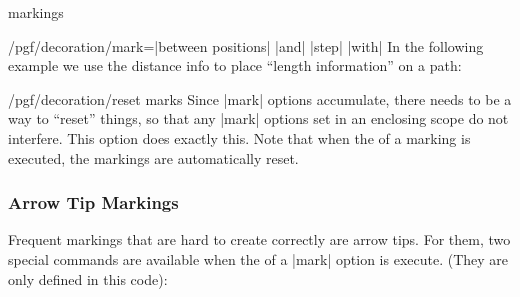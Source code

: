 \begin{decoration}{markings}
\begin{key}{/pgf/decoration/mark=|between positions|
       |and|  |step| 
      |with| }
    In the following example we use the distance info to place
    ``length information'' on a path:
\begin{codeexample}[]
\end{codeexample}      
  \end{key}

  \begin{key}{/pgf/decoration/reset marks}
    Since |mark| options accumulate, there needs to be a way to
    ``reset'' things, so that any |mark| options set in an enclosing
    scope do not interfere. This option does exactly this. Note that
    when the  of a marking is executed, the markings are
    automatically reset.
  \end{key}
\end{decoration}


\subsubsection{Arrow Tip Markings}

Frequent markings that are hard to create correctly are arrow
tips. For them, two special commands are available when the  of
a |mark| option is execute. (They are only defined in this code):

